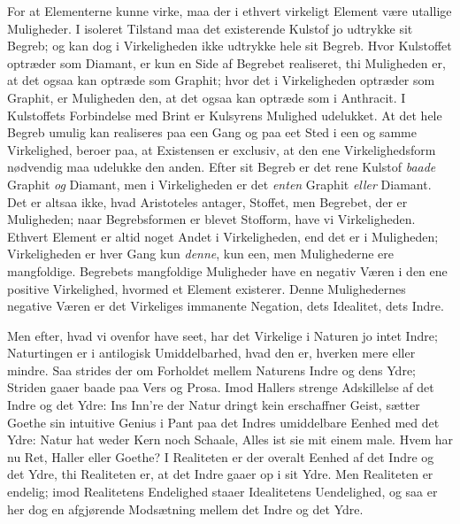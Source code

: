 \documentclass[12pt,a4paper]{book}
\begin{document}
For at Elementerne kunne virke, maa der i ethvert virkeligt Element være
utallige Muligheder. I isoleret Tilstand maa det existerende Kulstof jo
udtrykke sit Begreb; og kan dog i Virkeligheden ikke udtrykke hele sit
Begreb. Hvor Kulstoffet optræder som Diamant, er kun en Side af Begrebet
realiseret, thi Muligheden er, at det ogsaa kan optræde som Graphit; hvor
det i Virkeligheden optræder
som Graphit, er Muligheden den, at det ogsaa kan optræde som i Anthracit.
I Kulstoffets Forbindelse med Brint er Kulsyrens Mulighed udelukket. At
det hele Begreb umulig kan realiseres paa een Gang og paa eet Sted i een
og samme Virkelighed, beroer paa, at Existensen er exclusiv, at den ene
Virkelighedsform nødvendig maa udelukke den anden. Efter sit Begreb er det
rene Kulstof \emph{baade} Graphit \emph{og} Diamant, men i Virkeligheden
er det \emph{enten} Graphit \emph{eller} Diamant. Det er altsaa ikke, hvad
Aristoteles antager, Stoffet, men Begrebet, der er Muligheden; naar
Begrebsformen er blevet Stofform, have vi Virkeligheden. Ethvert Element
er altid noget Andet i Virkeligheden, end det er i Muligheden;
Virkeligheden er hver Gang kun \emph{denne}, kun een, men Mulighederne ere
mangfoldige. Begrebets mangfoldige Muligheder have en negativ Væren i den
ene positive Virkelighed, hvormed et Element existerer. Denne
Mulighedernes negative Væren er det Virkeliges immanente Negation, dets
Idealitet, dets Indre.

Men efter, hvad vi ovenfor have seet, har det Virkelige i Naturen jo intet
Indre; Naturtingen er i antilogisk Umiddelbarhed, hvad den er, hverken
mere eller mindre. Saa strides der om Forholdet mellem Naturens Indre og
dens Ydre; Striden gaaer baade paa Vers og Prosa. Imod Hallers strenge
Adskillelse af det Indre og det Ydre: Ins Inn're der Natur dringt kein
erschaffner Geist, sætter Goethe sin intuitive Genius i Pant paa det
Indres umiddelbare Eenhed med det Ydre: Natur hat weder Kern noch Schaale,
Alles ist sie mit einem male. Hvem har nu Ret, Haller eller Goethe? I
Realiteten er der overalt Eenhed af det Indre og det Ydre, thi Realiteten
er, at det Indre gaaer op i sit Ydre. Men Realiteten er endelig; imod
Realitetens Endelighed staaer Idealitetens Uendelighed, og saa er her dog
en afgjørende Modsætning mellem det Indre og det Ydre.
\end{document}
